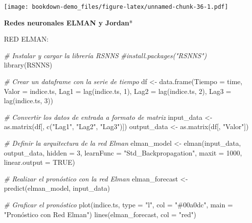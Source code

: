 \documentclass[
]{book}
\newenvironment{Shaded}{\begin{snugshade}}{\end{snugshade}}
\newcommand{\AttributeTok}[1]{\textcolor[rgb]{0.77,0.63,0.00}{#1}}
\newcommand{\CommentTok}[1]{\textcolor[rgb]{0.56,0.35,0.01}{\textit{#1}}}
\newcommand{\ConstantTok}[1]{\textcolor[rgb]{0.00,0.00,0.00}{#1}}
\newcommand{\DecValTok}[1]{\textcolor[rgb]{0.00,0.00,0.81}{#1}}
\newcommand{\FunctionTok}[1]{\textcolor[rgb]{0.00,0.00,0.00}{#1}}
\newcommand{\NormalTok}[1]{#1}
\newcommand{\OtherTok}[1]{\textcolor[rgb]{0.56,0.35,0.01}{#1}}
\newcommand{\StringTok}[1]{\textcolor[rgb]{0.31,0.60,0.02}{#1}}
\begin{document}
\texttt{[image: bookdown-demo\_files/figure-latex/unnamed-chunk-36-1.pdf]}

\textbf{Redes neuronales ELMAN y Jordan}*

RED ELMAN:

\begin{Shaded}
\begin{Highlighting}[]
\CommentTok{\# Instalar y cargar la librería RSNNS}
\CommentTok{\#install.packages("RSNNS")}
\FunctionTok{library}\NormalTok{(RSNNS)}

\CommentTok{\# Crear un dataframe con la serie de tiempo}
\NormalTok{df }\OtherTok{\textless{}{-}} \FunctionTok{data.frame}\NormalTok{(}\AttributeTok{Tiempo =}\NormalTok{ time,}
                 \AttributeTok{Valor =}\NormalTok{ indice.ts,}
                 \AttributeTok{Lag1 =} \FunctionTok{lag}\NormalTok{(indice.ts, }\DecValTok{1}\NormalTok{),}
                 \AttributeTok{Lag2 =} \FunctionTok{lag}\NormalTok{(indice.ts, }\DecValTok{2}\NormalTok{),}
                 \AttributeTok{Lag3 =} \FunctionTok{lag}\NormalTok{(indice.ts, }\DecValTok{3}\NormalTok{))}

\CommentTok{\# Convertir los datos de entrada a formato de matriz}
\NormalTok{input\_data }\OtherTok{\textless{}{-}} \FunctionTok{as.matrix}\NormalTok{(df[, }\FunctionTok{c}\NormalTok{(}\StringTok{"Lag1"}\NormalTok{, }\StringTok{"Lag2"}\NormalTok{, }\StringTok{"Lag3"}\NormalTok{)])}
\NormalTok{output\_data }\OtherTok{\textless{}{-}} \FunctionTok{as.matrix}\NormalTok{(df[, }\StringTok{"Valor"}\NormalTok{])}

\CommentTok{\# Definir la arquitectura de la red Elman}
\NormalTok{elman\_model }\OtherTok{\textless{}{-}} \FunctionTok{elman}\NormalTok{(input\_data, output\_data, }\AttributeTok{hidden =} \DecValTok{3}\NormalTok{, }\AttributeTok{learnFunc =} \StringTok{"Std\_Backpropagation"}\NormalTok{, }
                     \AttributeTok{maxit =} \DecValTok{1000}\NormalTok{, }\AttributeTok{linear.output =} \ConstantTok{TRUE}\NormalTok{)}

\CommentTok{\# Realizar el pronóstico con la red Elman}
\NormalTok{elman\_forecast }\OtherTok{\textless{}{-}} \FunctionTok{predict}\NormalTok{(elman\_model, input\_data)}

\CommentTok{\# Graficar el pronóstico}
\FunctionTok{plot}\NormalTok{(indice.ts, }\AttributeTok{type =} \StringTok{"l"}\NormalTok{, }\AttributeTok{col =} \StringTok{"\#00a0dc"}\NormalTok{, }\AttributeTok{main =} \StringTok{"Pronóstico con Red Elman"}\NormalTok{)}
\FunctionTok{lines}\NormalTok{(elman\_forecast, }\AttributeTok{col =} \StringTok{"red"}\NormalTok{)}
\end{Highlighting}
\end{Shaded}
\end{document}
